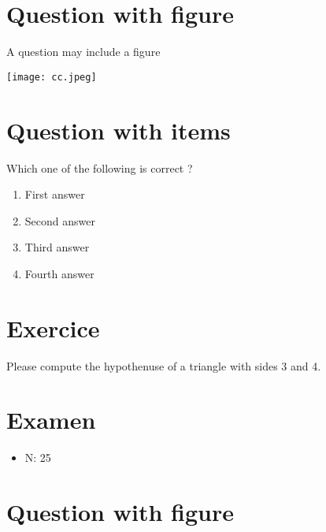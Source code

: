 \documentclass[a4paper,11pt,twoside]{article}
\begin{document}
\section*{Question with figure}
\label{sec:org2594043}


A question may include a figure

\begin{center}
\texttt{[image: cc.jpeg]}
\end{center}



\section*{Question with items}
\label{sec:org8b192de}

Which one of the following is correct ?

\begin{enumerate}
\item First answer
\item Second answer
\item Third answer
\item Fourth answer
\end{enumerate}



\section*{Exercice}
\label{sec:orgf8fbd74}

Please compute the hypothenuse of a triangle with sides 3 and 4.



\subsection*{}
\label{sec:org609ee85}

\cleardoublepage

\section*{Examen}
\label{sec:org2056b33}
\begin{itemize}
\item N: 25
\end{itemize}
\section*{Question with figure}
\label{sec:orgeff5ab3}
\end{document}
